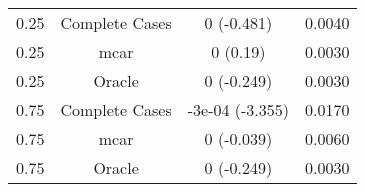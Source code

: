 \begin{table}[ht]
\centering
\begin{tabular}{cccc}
  \hline
  \hline
0.25 & Complete Cases & 0 (-0.481) & 0.0040 \\ 
  0.25 & mcar & 0 (0.19) & 0.0030 \\ 
  0.25 & Oracle & 0 (-0.249) & 0.0030 \\ 
  0.75 & Complete Cases & -3e-04 (-3.355) & 0.0170 \\ 
  0.75 & mcar & 0 (-0.039) & 0.0060 \\ 
  0.75 & Oracle & 0 (-0.249) & 0.0030 \\ 
   \hline
\end{tabular}
\end{table}
